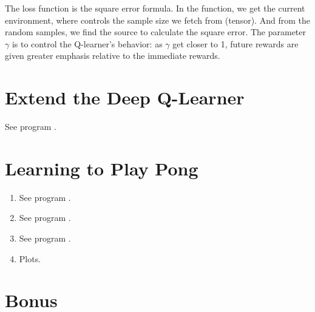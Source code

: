 \documentclass[12pt]{article}
\newcommand{\1}{\mathds{1}}
\newcommand{\<}{\langle}
\renewcommand{\>}{\rangle}
\begin{document}
The loss function is the square error formula.
In the function, we get the current environment,
where  controls the sample size we fetch from  (tensor).
And from the random samples, we find the source to calculate the square error.
The parameter $\gamma$ is to control the Q-learner's behavior:
as $\gamma$ get closer to 1,
future rewards are given greater emphasis relative to the immediate rewards.


\section{Extend the Deep Q-Learner}

See program .


\section{Learning to Play Pong}

\begin{enumerate}
    \item See program .
    \item See program .
    \item See program .
    \item Plots.
\end{enumerate}


\section{Bonus}
\end{document}

